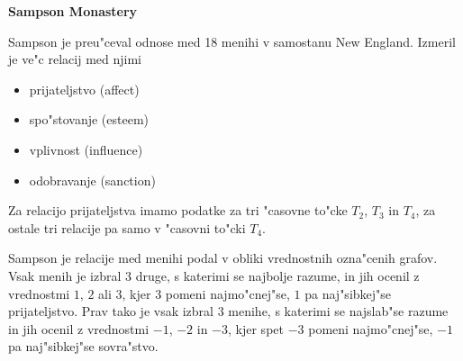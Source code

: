 \documentclass[12pt,a4paper]{article}
\begin{document}
\pagestyle{empty}
{\bf Sampson Monastery}

Sampson je preu"ceval odnose med 18 menihi v samostanu 
New England. Izmeril je ve"c relacij med njimi

\begin{itemize}
\item prijateljstvo (affect)
\item spo"stovanje (esteem)
\item vplivnost (influence)
\item odobravanje (sanction)
\end{itemize}

Za relacijo prijateljstva imamo podatke za tri "casovne to"cke 
$T_2$, $T_3$ in $T_4$, za ostale tri relacije pa samo v "casovni to"cki $T_4$.

Sampson je relacije med menihi podal v obliki
vrednostnih ozna"cenih grafov. Vsak menih je izbral $3$ druge, s katerimi
se najbolje razume, in jih ocenil z vrednostmi $1$, $2$ ali $3$, 
kjer $3$ pomeni najmo"cnej"se, $1$ pa naj"sibkej"se prijateljstvo.
Prav tako je vsak izbral $3$ menihe, s katerimi se najslab"se razume 
in jih ocenil z vrednostmi $-1$, $-2$ in $-3$, kjer spet $-3$ 
pomeni najmo"cnej"se, $-1$ pa naj"sibkej"se sovra"stvo. 
\end{document}
